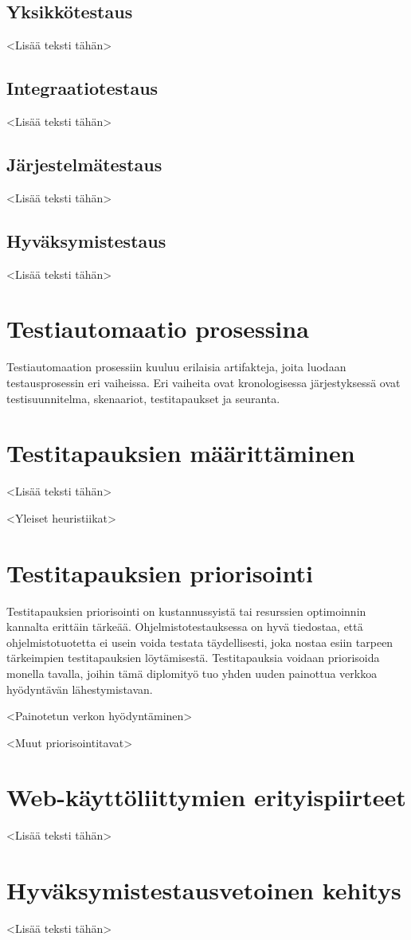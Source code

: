   \subsection{Yksikkötestaus}

  <Lisää teksti tähän>

  \subsection{Integraatiotestaus}

  <Lisää teksti tähän>

  \subsection{Järjestelmätestaus}

  <Lisää teksti tähän>

  \subsection{Hyväksymistestaus}

  <Lisää teksti tähän>

\section{Testiautomaatio prosessina}

Testiautomaation prosessiin kuuluu erilaisia artifakteja, joita luodaan testausprosessin eri vaiheissa.
Eri vaiheita ovat kronologisessa järjestyksessä ovat testisuunnitelma, skenaariot, testitapaukset ja seuranta.

\section{Testitapauksien määrittäminen}

<Lisää teksti tähän>

<Yleiset heuristiikat>

\section{Testitapauksien priorisointi}

Testitapauksien priorisointi on kustannussyistä tai resurssien optimoinnin kannalta erittäin tärkeää.
Ohjelmistotestauksessa on hyvä tiedostaa, että ohjelmistotuotetta ei usein voida testata täydellisesti, joka nostaa esiin tarpeen tärkeimpien testitapauksien löytämisestä.
Testitapauksia voidaan priorisoida monella tavalla, joihin tämä diplomityö tuo yhden uuden painottua verkkoa hyödyntävän lähestymistavan.

<Painotetun verkon hyödyntäminen>

<Muut priorisointitavat>

\section{Web-käyttöliittymien erityispiirteet}

<Lisää teksti tähän>

\section{Hyväksymistestausvetoinen kehitys}

<Lisää teksti tähän>
